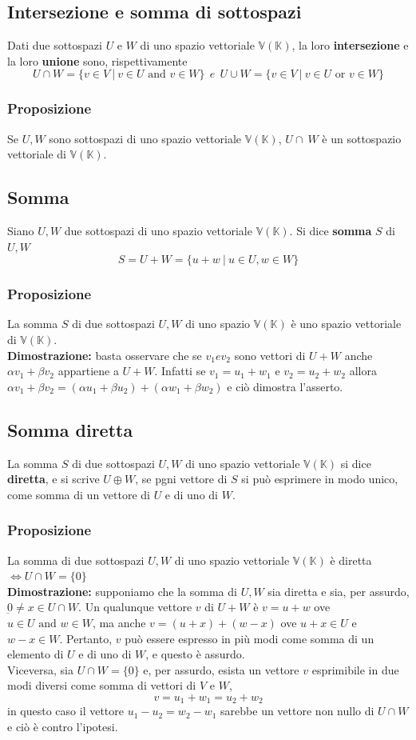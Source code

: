 \documentclass{article}
\newcommand{\V}{\mathbb{V} (\mathbb{K})}
\newcommand{\ah}{\alpha}
\newcommand{\bh}{\beta}
\begin{document}
\subsection{Intersezione e somma di sottospazi}
Dati due sottospazi $U$ e $W$ di uno spazio vettoriale $\V$, la loro
\textbf{intersezione} e la loro \textbf{unione} sono, rispettivamente
\[
    U \cap W = \{v\in V \ | \ v\in U \text{ and } v\in W  \} \ \ e \ \ U \cup W = \{v\in V \ | \ v\in U \text{ or } v\in W  \}
\]

\subsubsection{Proposizione}
Se $U, W$ sono sottospazi di uno spazio vettoriale $\V$, $U\cap\ W$ è un
sottospazio vettoriale di $\V$.

\subsection{Somma}
Siano $U, W$ due sottospazi di uno spazio vettoriale $\V$. Si dice
\textbf{somma} $S$ di $U, W$
\[
    S = U + W = \{u+w \ | \ u \in U,w\in W\}
\]
\subsubsection{Proposizione}
La somma $S$ di due sottospazi $U, W$ di uno spazio $\V$ è uno spazio
vettoriale di $\V$.\\ \textbf{Dimostrazione:} basta osservare che se $v_1 e
    v_2$ sono vettori di $U+W$ anche $\ah{} v_1+\bh{} v_2$ appartiene a $U+W$.
Infatti se $v_1 = u_1+w_1$ e $v_2 = u_2 + w_2$ allora $\ah{} v_1 + \bh{} v_2 =
    (\ah{} u_1 + \bh{} u_2)+ (\ah{} w_1 + \bh{} w_2)$ e ciò dimostra l'asserto.

\subsection{Somma diretta}
La somma $S$ di due sottospazi $U,W$ di uno spazio vettoriale $\V$ si dice
\textbf{diretta}, e si scrive $U\oplus{W}$, se pgni vettore di $S$ si può
esprimere in modo unico, come somma di un vettore di $U$ e di uno di $W$.

\subsubsection{Proposizione}
La somma di due sottospazi $U, W$ di uno spazio vettoriale $\V$ è diretta
$\iff{U} \cap{W} = \{0\}$ \\ \textbf{Dimostrazione:} supponiamo che la somma di
$U,W$ sia diretta e sia, per assurdo, $\underbar{0} \ne{} x\in{U}\cap{} W$. Un
qualunque vettore $v$ di $U+W$ è $v=u+w$ ove $u\in{U}\text{ and } w\in{W}$, ma
anche $v= (u+x)+ (w-x)$ ove $u+x\in{U}$ e $w-x\in{W}$. Pertanto, $v$ può essere
espresso in più modi come somma di un elemento di $U$ e di uno di $W$, e questo
è assurdo.\\ Viceversa, sia $U\cap{W} = \{\underbar{0}\}$ e, per assurdo,
esista un vettore $v$ esprimibile in due modi diversi come somma di vettori di
$V$ e $W$,
\[
    v=u_1+w_1=u_2+w_2
\]
in questo caso il vettore $u_1-u_2=w_2-w_1$ sarebbe un vettore non nullo di
$U\cap{W}$ e ciò è contro l'ipotesi.
\end{document}
